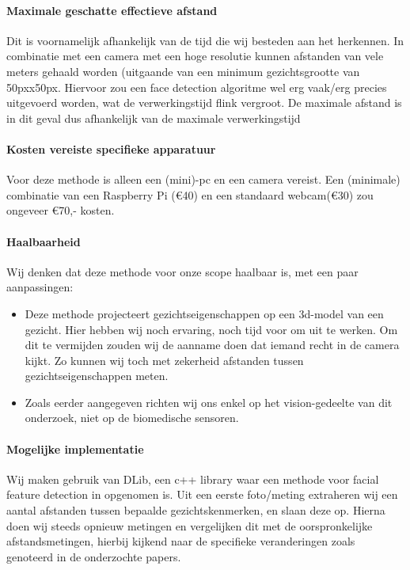 \documentclass[11pt]{article}
\begin{document}
    \paragraph{Maximale geschatte effectieve afstand}
    Dit is voornamelijk afhankelijk van de tijd die wij besteden aan het herkennen.
    In combinatie met een camera met een hoge resolutie kunnen afstanden van vele meters gehaald worden (uitgaande van een minimum gezichtsgrootte van 50pxx50px.
    Hiervoor zou een face detection algoritme wel erg vaak/erg precies uitgevoerd worden, wat de verwerkingstijd flink vergroot.
    De maximale afstand is in dit geval dus afhankelijk van de maximale verwerkingstijd

    \paragraph{Kosten vereiste specifieke apparatuur}
    Voor deze methode is alleen een (mini)-pc en een camera vereist.
    Een (minimale) combinatie van een Raspberry Pi (\euro{}40) en een standaard webcam(\euro{}30) zou ongeveer \euro{}70,- kosten.

    \paragraph{Haalbaarheid}
    Wij denken dat deze methode voor onze scope haalbaar is, met een paar aanpassingen:
    \begin{itemize}
        \item Deze methode projecteert gezichtseigenschappen op een 3d-model van een gezicht.
        Hier hebben wij noch ervaring, noch tijd voor om uit te werken.
        Om dit te vermijden zouden wij de aanname doen dat iemand recht in de camera kijkt.
        Zo kunnen wij toch met zekerheid afstanden tussen gezichtseigenschappen meten.
        \item Zoals eerder aangegeven richten wij ons enkel op het vision-gedeelte van dit onderzoek, niet op de biomedische sensoren.
    \end{itemize}

    \paragraph{Mogelijke implementatie}
    Wij maken gebruik van DLib, een c++ library waar een methode voor facial feature detection in opgenomen is.
    Uit een eerste foto/meting extraheren wij een aantal afstanden tussen bepaalde gezichtskenmerken, en slaan deze op.
    Hierna doen wij steeds opnieuw metingen en vergelijken dit met de oorspronkelijke afstandsmetingen,
    hierbij kijkend naar de specifieke veranderingen zoals genoteerd in de onderzochte papers.
\end{document}
